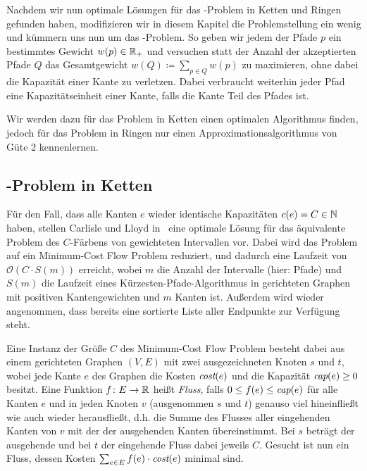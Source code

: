 Nachdem wir nun optimale Lösungen für das \CallControl-Problem in Ketten und Ringen gefunden haben, modifizieren
wir in diesem Kapitel die Problemstellung ein wenig und kümmern uns nun um das \WeightedCallControl-Problem.
So geben wir jedem der Pfade $p$ ein bestimmtes Gewicht $w(p) \in \mathbb R_+$ und versuchen statt der
Anzahl der akzeptierten Pfade $Q$ das Gesamtgewicht $w(Q) \coloneqq \sum_{p\in Q}w(p)$ zu maximieren, ohne
dabei die Kapazität einer Kante zu verletzen.
Dabei verbraucht weiterhin jeder Pfad eine Kapazitätseinheit einer Kante, falls die Kante Teil des Pfades ist.

Wir werden dazu für das Problem in Ketten einen optimalen Algorithmus finden, jedoch für das Problem in Ringen
nur einen Approximationsalgorithmus von Güte 2 kennenlernen.

\subsection{\WeightedCallControl-Problem in Ketten}\label{subsec:weighted-call-control-in-chains}
Für den Fall, dass alle Kanten $e$ wieder identische Kapazitäten $c(e) = C \in \mathbb N$ haben, stellen Carlisle und Lloyd
in~\cite{carlisle} eine optimale Lösung für das äquivalente Problem des $C$-Färbens von gewichteten Intervallen vor.
Dabei wird das Problem auf ein Minimum-Cost Flow Problem reduziert, und dadurch eine Laufzeit von $\mathcal O(C\cdot S(m))$
erreicht, wobei $m$ die Anzahl der Intervalle (hier: Pfade) und $S(m)$ die Laufzeit eines Kürzesten-Pfade-Algorithmus
in gerichteten Graphen mit positiven Kantengewichten und $m$ Kanten ist.
Außerdem wird wieder angenommen, dass bereits eine sortierte Liste aller Endpunkte zur Verfügung steht.

Eine Instanz der Größe $C$ des Minimum-Cost Flow Problem besteht dabei aus einem gerichteten Graphen $(V,E)$ mit zwei
ausgezeichneten Knoten $s$ und $t$, wobei jede Kante $e$ des Graphen die Kosten $\text{\em cost}(e)$ und die Kapazität
$\text{\em cap}(e) \geq 0$ besitzt.
Eine Funktion $f\colon E \rightarrow \mathbb R$ heißt {\em Fluss}, falls $0 \leq f(e) \leq \text{\em cap}(e)$ für alle
Kanten $e$ und in jeden Knoten $v$ (ausgenommen $s$ und $t$) genauso viel hineinfließt wie auch wieder herausfließt, d.h.
die Summe des Flusses aller eingehenden Kanten von $v$ mit der der ausgehenden Kanten übereinstimmt.
Bei $s$ beträgt der ausgehende und bei $t$ der eingehende Fluss dabei jeweils $C$.
Gesucht ist nun ein Fluss, dessen Kosten $\sum_{e\in E}f(e) \cdot \text{\em cost}(e)$ minimal sind.

